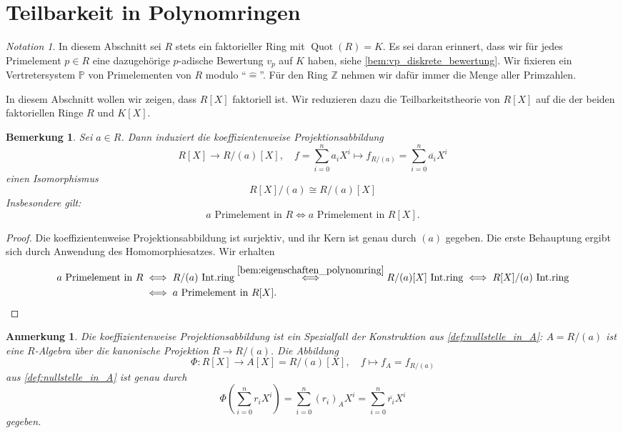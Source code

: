 \documentclass[a4paper, twoside, 11pt, ngerman]{report}
\newcommand{\PP}{\mathds P}
\newcommand{\ZZ}{\mathds Z}
\newcommand{\assoc}{\mathrel{\widehat{=}}}
\DeclareMathOperator{\Quot}{Quot}
\theoremstyle{definistyle}
\newtheorem{bem}[satz]{Bemerkung}
\newtheorem{anm}[satz]{Anmerkung}
\theoremstyle{remark}
\newtheorem*{notation}{Notation}
\begin{document}
\section{Teilbarkeit in Polynomringen}

\begin{notation}
In diesem Abschnitt sei $R$ stets ein faktorieller Ring mit $\Quot(R) = K$. Es sei daran erinnert, dass wir für jedes Primelement $p\in R$ eine dazugehörige $p$-adische Bewertung $v_p$ auf $K$ haben, siehe \ref{bem:vp_diskrete_bewertung}. Wir fixieren ein Vertretersystem $\PP$ von Primelementen von $R$ modulo "`$\assoc$"'. Für den Ring $\ZZ$ nehmen wir dafür immer die Menge aller Primzahlen. 
\end{notation}

In diesem Abschnitt wollen wir zeigen, dass $R[X]$ faktoriell ist. Wir reduzieren dazu die Teilbarkeitstheorie von $R[X]$ auf die der beiden faktoriellen Ringe $R$ und $K[X]$.


\begin{bem}\label{bem:prim_element_in_R_auch_in_RX}
Sei $a\in R$. Dann induziert die koeffizientenweise Projektionsabbildung
\[
R[X] \to R / (a)[X], \quad f=\sum_{i=0}^n a_i X^i \mapsto f_{R/(a)}=\sum_{i=0}^n \overline{a_i} X^i
\]
einen Isomorphismus
\[
R[X]/(a) \cong R / (a)[X]
\]
Insbesondere gilt:
\[
a \text{ Primelement in } R \iff  a \text { Primelement in } R[X].
\]
\end{bem}

\begin{proof}
Die koeffizientenweise Projektionsabbildung ist surjektiv, und ihr Kern ist genau durch $(a)$
gegeben. Die erste Behauptung ergibt sich durch Anwendung des Homomorphiesatzes.
Wir erhalten
\begin{align*}
a\text{ Primelement in } R &\iff R / (a) \text{ Int.ring} \overset{\ref{bem:eigenschaften_polynomring}}{\iff} R / (a)[X] \text{ Int.ring} 
\iff R[X] / (a) \text{ Int.ring} \\
&\iff \text{$a$ Primelement in } R[X].
\end{align*}
\end{proof}

\begin{anm}
Die koeffizientenweise Projektionsabbildung ist ein Spezialfall der Konstruktion aus \ref{def:nullstelle_in_A}:
$A=R/(a)$ ist eine $R$-Algebra über die kanonische Projektion $R\to R/(a)$. Die Abbildung \[\Phi\colon R[X]\to A[X]=R/(a)[X], \quad f\mapsto f_A=f_{R/(a)}\]
aus \ref{def:nullstelle_in_A} ist genau durch
\[
\Phi(\sum_{i=0}^n r_i X^i) = \sum_{i=0}^n (r_i)_A X^i = \sum_{i=0}^n \overline{r_i} X^i
\]
gegeben.
\end{anm}
\end{document}
